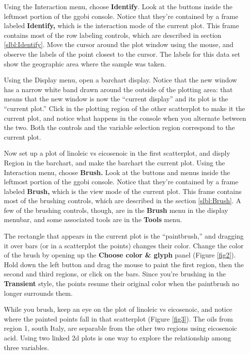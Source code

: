 \documentclass[11pt]{article}
\def\Widget#1{\textbf{#1}}
\begin{document}
Using the Interaction menu, choose \Widget{Identify}. Look at the buttons
inside the leftmost portion of the ggobi console. Notice that they're
contained by a frame labeled \Widget{Identify,} which is the interaction mode
of the current plot.  This frame contains most of the row labeling
controls, which are described in section \ref{slbl:Identify}. Move the
cursor around the plot window using the mouse, and observe the labels
of the point closest to the cursor.  The labels for this data set show
the geographic area where the sample was taken.

Using the Display menu, open a barchart display. Notice that the new
window has a narrow white band drawn around the outside of the plotting
area:  that means that the new window is now the ``current display''
and its plot is the ``current plot.''  Click in the plotting region
of the other scatterplot to make it the current plot, and notice what
happens in the console when you alternate between the two.  Both the
controls and the variable selection region correspond to the current plot.

Now set up a plot of linoleic vs eicosenoic in the first scatterplot,
and disply Region in the barchart, and make the barchart the current
plot.  Using the Interaction menu, choose \Widget{Brush.}  Look at the
buttons and menus inside the leftmost portion of the ggobi console.
Notice that they're contained by a frame labeled \Widget{Brush,} which is
the view mode of the current plot.  This frame contains most of the
brushing controls, which are described in the section
\ref{slbl:Brush}.  A few of the brushing controls, though, are in the
\Widget{Brush} menu in the display menubar, and some associated tools
are in the \Widget{Tools} menu.

The rectangle that appears in the current plot is the ``paintbrush,''
and dragging it over bars (or in a scatterplot the points) changes
their color. Change the color of the brush by opening up the
\Widget{Choose color \& glyph} panel (Figure \ref{fig2}). Hold down
the left button and drag the mouse to paint the first region, then the
second and third regions, or click on the bars.  Since you're brushing
in the \Widget{Transient} style, the points resume their original
color when the paintbrush no longer surrounds them.

While you brush, keep an eye on the plot of linoleic vs eicosenoic,
and notice where the painted points fall in that scatterplot (Figure
\ref{fig3}).  The oils from region 1, south Italy, are separable from
the other two regions using eicosenoic acid. Using two linked 2d plots
is one way to explore the relationship among three variables.
\end{document}
